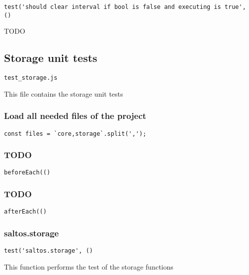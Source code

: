 \documentclass[a4paper]{article}
\begin{document}
\begin{lstlisting}
test('should clear interval if bool is false and executing is true', ()
\end{lstlisting}

TODO

\hypertarget{toc695}{}
\subsection{Storage unit tests}

\begin{lstlisting}
test_storage.js
\end{lstlisting}

This file contains the storage unit tests

\hypertarget{toc696}{}
\subsubsection{Load all needed files of the project}

\begin{lstlisting}
const files = `core,storage`.split(',');
\end{lstlisting}

\hypertarget{toc697}{}
\subsubsection{TODO}

\begin{lstlisting}
beforeEach(()
\end{lstlisting}

\hypertarget{toc698}{}
\subsubsection{TODO}

\begin{lstlisting}
afterEach(()
\end{lstlisting}

\hypertarget{toc699}{}
\subsubsection{saltos.storage}

\begin{lstlisting}
test('saltos.storage', ()
\end{lstlisting}

This function performs the test of the storage functions
\end{document}
